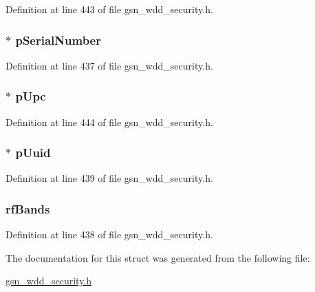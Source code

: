 Definition at line 443 of file gsn\_\-wdd\_\-security.h.

\hypertarget{a00296_a22ea7e7af119a5bf1946646753205fd5}{
\subsubsection[{pSerialNumber}]{$\ast$ {\bf pSerialNumber}}}
\label{a00296_a22ea7e7af119a5bf1946646753205fd5}


Definition at line 437 of file gsn\_\-wdd\_\-security.h.

\hypertarget{a00296_a785807e9bd8686cba78d8fee5df61863}{
\subsubsection[{pUpc}]{$\ast$ {\bf pUpc}}}
\label{a00296_a785807e9bd8686cba78d8fee5df61863}


Definition at line 444 of file gsn\_\-wdd\_\-security.h.

\hypertarget{a00296_ac9629a29e7c03e9f6c8b93e2e31c4ca7}{
\subsubsection[{pUuid}]{$\ast$ {\bf pUuid}}}
\label{a00296_ac9629a29e7c03e9f6c8b93e2e31c4ca7}


Definition at line 439 of file gsn\_\-wdd\_\-security.h.

\hypertarget{a00296_a17421dd2bb895ce242cf45673a019a4a}{
\subsubsection[{rfBands}]{ {\bf rfBands}}}
\label{a00296_a17421dd2bb895ce242cf45673a019a4a}


Definition at line 438 of file gsn\_\-wdd\_\-security.h.



The documentation for this struct was generated from the following file:\begin{DoxyCompactItemize}
\item 
\hyperlink{a00604}{gsn\_\-wdd\_\-security.h}\end{DoxyCompactItemize}
